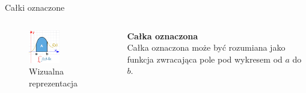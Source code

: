 \documentclass[aspectratio=169,xcolor=dvipsnames]{beamer}
\begin{document}
\begin{frame}{Całki oznaczone}
    \begin{columns}[c]
        
        \begin{figure}
            \centering
            \includegraphics[width=0.5\textwidth]{oznaczone.png}
            \caption{\label{fig:oznaczone}Wizualna reprezentacja}
        \end{figure}
        
        \textbf{Całka oznaczona}\\
        Całka oznaczona może być rozumiana jako funkcja zwracająca pole pod wykresem od $a$ do $b$.

    \end{columns}
\end{frame}


\end{document}
